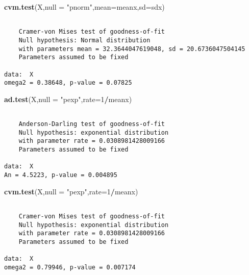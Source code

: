 \documentclass[
  a4paper,
  oneside,
  openany]{book}
\newenvironment{Shaded}{\begin{snugshade}}{\end{snugshade}}
\newcommand{\AttributeTok}[1]{\textcolor[rgb]{0.13,0.29,0.53}{#1}}
\newcommand{\DecValTok}[1]{\textcolor[rgb]{0.00,0.00,0.81}{#1}}
\newcommand{\FunctionTok}[1]{\textcolor[rgb]{0.13,0.29,0.53}{\textbf{#1}}}
\newcommand{\NormalTok}[1]{#1}
\newcommand{\SpecialCharTok}[1]{\textcolor[rgb]{0.81,0.36,0.00}{\textbf{#1}}}
\newcommand{\StringTok}[1]{\textcolor[rgb]{0.31,0.60,0.02}{#1}}
\begin{document}
\begin{Shaded}
\begin{Highlighting}[]
\FunctionTok{cvm.test}\NormalTok{(X,}\AttributeTok{null =} \StringTok{"pnorm"}\NormalTok{,}\AttributeTok{mean=}\NormalTok{meanx,}\AttributeTok{sd=}\NormalTok{sdx)}
\end{Highlighting}
\end{Shaded}

\begin{verbatim}

    Cramer-von Mises test of goodness-of-fit
    Null hypothesis: Normal distribution
    with parameters mean = 32.3644047619048, sd = 20.6736047504145
    Parameters assumed to be fixed

data:  X
omega2 = 0.38648, p-value = 0.07825
\end{verbatim}

\begin{Shaded}
\begin{Highlighting}[]
\FunctionTok{ad.test}\NormalTok{(X,}\AttributeTok{null =} \StringTok{"pexp"}\NormalTok{,}\AttributeTok{rate=}\DecValTok{1}\SpecialCharTok{/}\NormalTok{meanx)}
\end{Highlighting}
\end{Shaded}

\begin{verbatim}

    Anderson-Darling test of goodness-of-fit
    Null hypothesis: exponential distribution
    with parameter rate = 0.0308981428009166
    Parameters assumed to be fixed

data:  X
An = 4.5223, p-value = 0.004895
\end{verbatim}

\begin{Shaded}
\begin{Highlighting}[]
\FunctionTok{cvm.test}\NormalTok{(X,}\AttributeTok{null =} \StringTok{"pexp"}\NormalTok{,}\AttributeTok{rate=}\DecValTok{1}\SpecialCharTok{/}\NormalTok{meanx)}
\end{Highlighting}
\end{Shaded}

\begin{verbatim}

    Cramer-von Mises test of goodness-of-fit
    Null hypothesis: exponential distribution
    with parameter rate = 0.0308981428009166
    Parameters assumed to be fixed

data:  X
omega2 = 0.79946, p-value = 0.007174
\end{verbatim}
\end{document}
